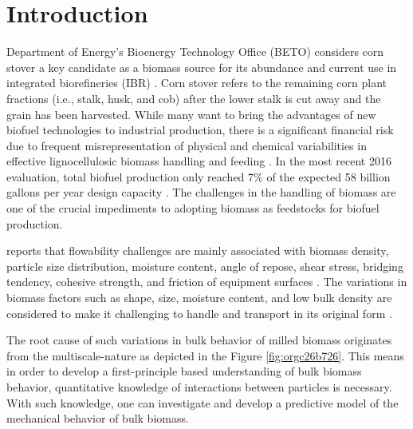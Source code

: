 \documentclass[xcolor=dvipsnames,10pt,hidelinks]{article}
\begin{document}
\section{Introduction}
\label{sec:orgbbaef78}
Department of Energy's Bioenergy Technology Office (BETO) considers corn stover a key candidate as a biomass source for its abundance and current use in integrated biorefineries (IBR) \citep{doyle_integrated_2014,usdoe_u.s._2011,langholtz_2016_2016,perlack_us_2011}. Corn stover refers to the remaining corn plant fractions (i.e., stalk, husk, and cob) after the lower stalk is cut away and the grain has been harvested.
While many want to bring the advantages of new biofuel technologies to industrial production, there is a significant financial risk due to frequent misrepresentation of physical and chemical variabilities in effective lignocellulosic biomass handling and feeding \citep{crawford_effects_2016,ray_multiscale_2020,Ray_BiomassBlendingDensification_2017}.
In the most recent 2016 evaluation, total biofuel production only reached 7\% of the expected 58 billion gallons per year design capacity \citep{westover_biomass_2018}.
The challenges in the handling of biomass are one of the crucial impediments to adopting biomass as feedstocks for biofuel production.

\citet{beto_biorefinery_2016} reports that flowability challenges are mainly associated with biomass density, particle size distribution, moisture content, angle of repose, shear stress, bridging tendency, cohesive strength, and friction of equipment surfaces \citep{westover_biomass_2018}.
The variations in biomass factors such as shape, size, moisture content, and low bulk density are considered to make it challenging to handle and transport in its original form \citep{kaliyan_roll_2009}.

The root cause of such variations in bulk behavior of milled biomass originates from the multiscale-nature as depicted in the Figure \ref{fig:orgc26b726}.
This means in order to develop a first-principle based understanding of bulk biomass behavior, quantitative knowledge of interactions between particles is necessary.
With such knowledge, one can investigate and develop a predictive model of the mechanical behavior of bulk biomass.
\end{document}
